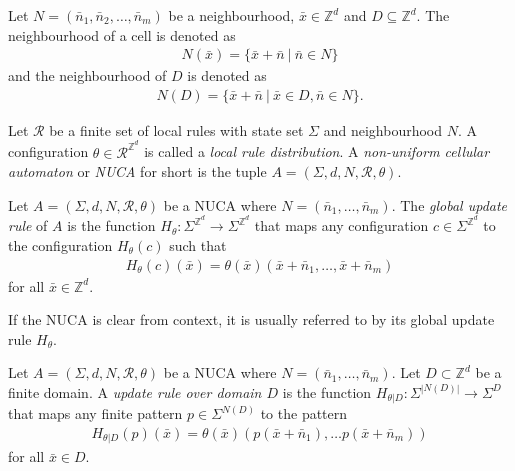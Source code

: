 \documentclass[runningheads]{llncs}
\newcommand{\Z}{\mathbb{Z}}
\newcommand{\set}[2]{\{ #1 \: | \: #2 \}}
\newcommand{\confspace}{\Sigma^{\Z^d}}
\begin{document}
\begin{notation}Let $N = (\bar n_1,\bar n_2,\ldots,\bar n_m)$ be a neighbourhood, $\bar x \in \Z^d$ and $D \subseteq \Z^d$. The neighbourhood of a cell is denoted as
\begin{align*}
N(\bar x) = \set{\bar x + \bar n}{\bar n \in N}
\end{align*}
and the neighbourhood of $D$ is denoted as
\begin{align*}
N(D) = \set{\bar x + \bar n}{\bar x \in D, \bar n \in N}.
\end{align*}
\end{notation}

\begin{definition} \emph{\cite{dennuz2}}
Let $\mathcal{R}$ be a finite set of local rules with state set $\Sigma$ and neighbourhood $N$. A configuration $\theta \in \mathcal{R}^{\Z^d}$ is called a \emph{local rule distribution}. A \emph{non-uniform cellular automaton} or \emph{NUCA} for short is the tuple $A = (\Sigma, d, N, \mathcal{R}, \theta)$. %
\end{definition} 

\begin{definition}
Let $A = (\Sigma, d, N, \mathcal{R}, \theta)$ be a NUCA where $N =(\bar{n}_1, \ldots, \bar{n}_m)$. The \emph{global update rule} of $A$ is the function $H_\theta:\confspace \rightarrow \confspace$ that maps any configuration $c \in \confspace$ to the configuration $H_\theta (c)$ such that
\begin{align*}
H_\theta(c)(\bar{x}) = \theta(\bar{x})(\bar{x}+ \bar{n}_1, \ldots, \bar{x}+ \bar{n}_m)
\end{align*}
for all $\bar{x} \in \Z^d$.
\end{definition}


If the NUCA is clear from context, it is usually referred to by its global update rule $H_\theta$.


\begin{definition}
Let $A = (\Sigma, d, N, \mathcal{R}, \theta)$ be a NUCA where $N =(\bar{n}_1, \ldots, \bar{n}_m)$. Let $D\subset \Z^d$ be a finite domain. A \emph{update rule over domain $D$} is the function $H_{\theta|D}:\Sigma^{|N(D)|}\rightarrow \Sigma^D$ that maps any finite pattern $p \in \Sigma^{N(D)}$ to the pattern
\begin{align*}
H_{\theta|D}(p)(\bar{x}) = \theta(\bar{x})(p(\bar{x}+\bar{n}_1), \ldots p(\bar{x}+\bar{n}_m))
\end{align*}
for all $\bar{x} \in D$.
\end{definition}
\end{document}
